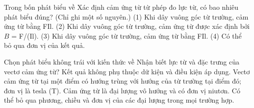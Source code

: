 \begin{ex}
Trong bốn phát biểu về Xác định cảm ứng từ từ phép đo lực từ, có bao nhiêu phát biểu đúng? (Chỉ ghi một số nguyên.) (1) Khi dây vuông góc từ trường, cảm ứng từ bằng FIl. (2) Khi dây vuông góc từ trường, cảm ứng từ được xác định bởi $B$ = F/(Il). (3) Khi dây vuông góc từ trường, cảm ứng từ bằng FIl. (4) Có thể bỏ qua đơn vị của kết quả.
\end{ex}

\begin{ex}
Chọn phát biểu không trái với kiến thức về Nhận biết lực từ và đặc trưng của vectơ cảm ứng từ?
\choice
{Kết quả không phụ thuộc dữ kiện và điều kiện áp dụng.}
{\True Vectơ cảm ứng từ tại một điểm có hướng trùng với hướng của từ trường tại điểm đó; đơn vị là tesla (T).}
{Cảm ứng từ là đại lượng vô hướng và có đơn vị niutơn.}
{Có thể bỏ qua phương, chiều và đơn vị của các đại lượng trong mọi trường hợp.}
\end{ex}

